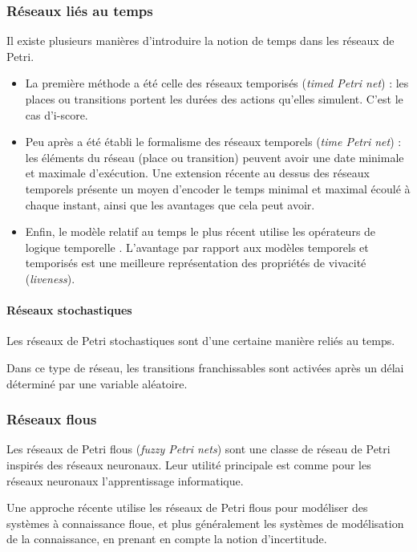 \subsubsection{Réseaux liés au temps}
Il existe plusieurs manières d'introduire la notion de temps dans les réseaux de Petri.
\begin{itemize}
\item La première méthode a été celle des réseaux temporisés (\textit{timed Petri net}) : les places ou transitions portent les durées des actions qu'elles simulent. C'est le cas d'i-score.

\item Peu après a été établi le formalisme des réseaux temporels (\textit{time Petri net}) : les éléments du réseau (place ou transition) peuvent avoir une date minimale et maximale d'exécution.
Une extension récente \cite{klai2013temporal} au dessus des réseaux temporels  présente un moyen d'encoder le temps minimal et maximal écoulé à chaque instant, ainsi que les avantages que cela peut avoir.

\item Enfin, le modèle relatif au temps le plus récent utilise les opérateurs de logique temporelle \cite{logic2002temporal,suzuki1989temporal}. L'avantage par rapport aux modèles temporels et temporisés est une meilleure représentation des propriétés de vivacité (\textit{liveness}).
\end{itemize}
\paragraph{Réseaux stochastiques}
Les réseaux de Petri stochastiques \cite{bause1996stochastic} sont d'une certaine manière reliés au temps.

Dans ce type de réseau, les transitions franchissables sont activées après un délai déterminé par une variable aléatoire.
 
\subsubsection{Réseaux flous}
Les réseaux de Petri flous (\textit{fuzzy Petri nets}) \cite{pedrycz1994generalized} sont une classe de réseau de Petri inspirés des réseaux neuronaux. Leur utilité principale est comme pour les réseaux neuronaux l'apprentissage informatique.

Une approche récente utilise les réseaux de Petri flous pour modéliser des systèmes à connaissance floue\cite{wang2014dynamic}, et plus généralement les systèmes de modélisation de la connaissance, en prenant en compte la notion d'incertitude.

